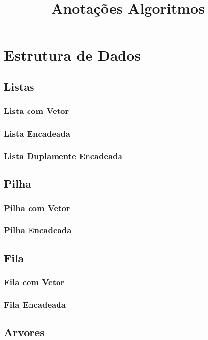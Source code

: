 \documentclass[10pt,a4paper]{article}
\title{Anotações Algoritmos}
\begin{document}
\maketitle
\tableofcontents
\newpage

\section{Estrutura de Dados}
\subsection{Listas}
\subsubsection{Lista com Vetor}
\subsubsection{Lista Encadeada}
\subsubsection{Lista Duplamente Encadeada}

\subsection{Pilha}
\subsubsection{Pilha com Vetor}
\subsubsection{Pilha Encadeada}

\subsection{Fila}
\subsubsection{Fila com Vetor}
\subsubsection{Fila Encadeada}

\subsection{Arvores}
\end{document}
